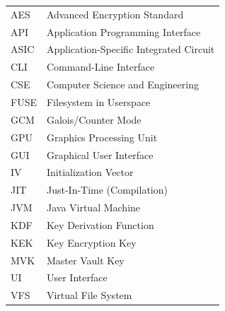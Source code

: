 \begin{longtable}[l]{l l}
AES    & Advanced Encryption Standard                       \\
API    & Application Programming Interface                  \\
ASIC   & Application-Specific Integrated Circuit            \\
CLI    & Command-Line Interface                             \\
CSE    & Computer Science and Engineering                   \\
FUSE   & Filesystem in Userspace                            \\
GCM    & Galois/Counter Mode                                \\
GPU    & Graphics Processing Unit                           \\
GUI    & Graphical User Interface                           \\
IV     & Initialization Vector                              \\
JIT    & Just-In-Time (Compilation)                         \\
JVM    & Java Virtual Machine                               \\
KDF    & Key Derivation Function                            \\
KEK    & Key Encryption Key                                 \\
MVK    & Master Vault Key                                   \\
UI     & User Interface                                     \\
VFS    & Virtual File System                                \\
\end{longtable}
